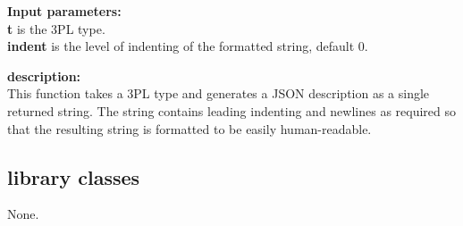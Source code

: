             {\bf Input parameters:} \\            
            {\bf t} is the 3PL type.\\
            {\bf indent} is the level of indenting of the formatted string, default 0.

            {\bf description:} \\
            This function takes a 3PL type and generates a JSON description as a
            single returned string. The string contains leading indenting and newlines
            as required so that the resulting string is formatted to be easily human-readable.



    \subsection{library classes}
    
        None.
